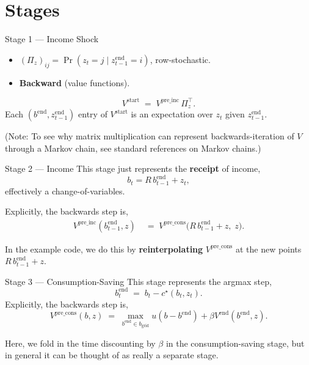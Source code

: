 \documentclass[10pt,aspectratio=169]{beamer}
\begin{document}
\section{Stages}

\begin{frame}{Stage 1 --- Income Shock}
  \begin{itemize}
    \item $(\Pi_z)_{ij} = \Pr(z_t = j \mid z^{\mathrm{end}}_{t-1} = i)$, row-stochastic.
    \item \textbf{Backward} (value functions).
  \end{itemize}
  \[
    V^{\mathrm{start}} \;=\; V^{\mathrm{pre\_inc}} \, \Pi_z^\top.
  \]
  Each $(b^{\mathrm{end}}, z^{\mathrm{end}}_{t-1})$ entry of $V^{\mathrm{start}}$ is an expectation over $z_t$ given $z^{\mathrm{end}}_{t-1}$.

  (Note: To see why matrix multiplication can represent backwards-iteration of $V$ through a Markov chain, see standard references on Markov chains.)
\end{frame}

\begin{frame}{Stage 2 --- Income}
  This stage just represents the \textbf{receipt} of income,
  \[
    b_t = R \, b^{\mathrm{end}}_{t-1} + z_t,
  \]
  effectively a change-of-variables.

  Explicitly, the backwards step is,
  \begin{align*}
    V^{\mathrm{pre\_inc}}(b^{\mathrm{end}}_{t-1}, z)
    \; &= \; V^{\mathrm{pre\_cons}}\!\big(R\, b^{\mathrm{end}}_{t-1} + z,\; z\big).
  \end{align*}

  In the example code, we do this by \textbf{reinterpolating} $V^{\mathrm{pre\_cons}}$ at the new points $R\, b^{\mathrm{end}}_{t-1} + z$.
\end{frame}

\begin{frame}{Stage 3 --- Consumption-Saving}
  This stage represents the argmax step,
  \[
    b^{\mathrm{end}}_t \;=\; b_t - c^\star(b_t, z_t).
  \]
  Explicitly, the backwards step is,
  \[
    V^{\mathrm{pre\_cons}}(b, z) \;=\; \max_{b^{\mathrm{end}} \in b_{\mathrm{grid}}} u(b - b^{\mathrm{end}}) + \beta V^{\mathrm{end}}(b^{\mathrm{end}}, z).
  \]
  
  Here, we fold in the time discounting by $\beta$ in the consumption-saving stage, but in general it can be thought of as really a separate stage.
\end{frame}
\end{document}
